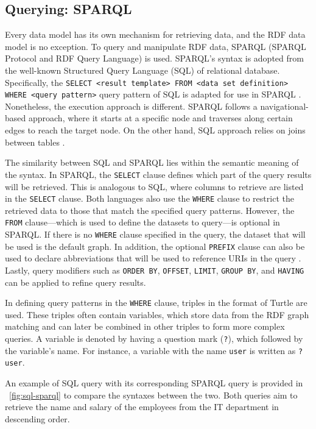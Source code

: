 \subsection{Querying: SPARQL}
Every data model has its own mechanism for retrieving data, and the RDF data model is no exception. To query and manipulate RDF data, SPARQL (SPARQL Protocol and RDF Query Language) is used. SPARQL's syntax is adopted from the well-known Structured Query Language (SQL) of relational database. Specifically, the \texttt{SELECT <result template> FROM <data set definition> WHERE <query pattern>} query pattern of SQL is adapted for use in SPARQL \citep{rdf-sws}. Nonetheless, the execution approach is different. SPARQL follows a navigational-based approach, where it starts at a specific node and traverses along certain edges to reach the target node. On the other hand, SQL approach relies on joins between tables \citep{rdf-sws}.

The similarity between SQL and SPARQL lies within the semantic meaning of the syntax. In SPARQL, the \texttt{SELECT} clause defines which part of the query results will be retrieved. This is analogous to SQL, where columns to retrieve are listed in the \texttt{SELECT} clause. Both languages also use the \texttt{WHERE} clause to restrict the retrieved data to those that match the specified query patterns. However, the \texttt{FROM} clause---which is used to define the datasets to query---is optional in SPARQL. If there is no \texttt{WHERE} clause specified in the query, the dataset that will be used is the default graph. In addition, the optional \texttt{PREFIX} clause can also be used to declare abbreviations that will be used to reference URIs in the query \citep{anzograph-sparql}. Lastly, query modifiers such as \texttt{ORDER BY}, \texttt{OFFSET}, \texttt{LIMIT}, \texttt{GROUP BY}, and \texttt{HAVING} can be applied to refine query results.

In defining query patterns in the \texttt{WHERE} clause, triples in the format of Turtle are used. These triples often contain variables, which store data from the RDF graph matching and can later be combined in other triples to form more complex queries. A variable is denoted by having a question mark (\texttt{?}), which followed by the variable's name. For instance, a variable with the name \texttt{user} is written as \texttt{?user}.

An example of SQL query with its corresponding SPARQL query is provided in \pic~\ref{fig:sql-sparql} to compare the syntaxes between the two. Both queries aim to retrieve the name and salary of the employees from the IT department in descending order.

